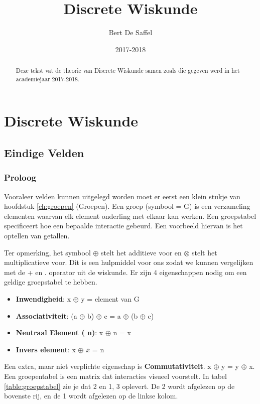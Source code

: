 \documentclass[12pt]{report}
\title{Discrete Wiskunde}
\author{Bert De Saffel}
\date{2017-2018}
\newcommand{\todo}[1] {
\color{red}\textunderscore{\textit{TODO: #1}}
\color{black}
}
\begin{document}
\maketitle
\tableofcontents

\begin{abstract}
 Deze tekst vat de theorie van Discrete Wiskunde samen zoals die gegeven werd in het academiejaar 2017-2018. 
 
\end{abstract}


\part{Discrete Wiskunde}
\chapter{Eindige Velden}

\section{Proloog}
\todo{veel korter schrijven}
Vooraleer velden kunnen uitgelegd worden moet er eerst een klein stukje van hoofdstuk \ref{ch:groepen} (Groepen). 
Een groep (symbool = {\color{red} G}) is een verzameling elementen waarvan elk element onderling met elkaar kan werken. Een groepstabel specificeert hoe een bepaalde 
interactie gebeurd. Een voorbeeld hiervan is het optellen van getallen.


Ter opmerking, het symbool $\oplus$ stelt het additieve voor en $\otimes$ stelt het multiplicatieve voor. Dit is een hulpmiddel
voor ons zodat we kunnen vergelijken met de + en . operator uit de wiskunde.
Er zijn 4 eigenschappen nodig om een geldige groepstabel te hebben.
\begin{itemize}
 \item {\textbf{Inwendigheid}: x $\oplus$ y = element van G}
 \item {\textbf{Associativiteit}: (a $\oplus$ b) $\oplus$ c = a $\oplus$ (b $\oplus$ c)}
 \item {\textbf{Neutraal Element ({\color{red} n})}: x $\oplus$ n = x}
 \item {\textbf{Invers element}: x $\oplus$ $\overline{x}$ = {\color{red} n}}
\end{itemize}
Een extra, maar niet verplichte eigenschap is \textbf{Commutativiteit}. x $\oplus$ y = y $\oplus$ x.
Een groepentabel is een matrix dat interacties visueel voorstelt. In tabel \ref{table:groepstabel} zie je dat 2 en 1, 3 oplevert. 
De 2 wordt afgelezen op de bovenste rij, en de 1 wordt afgelezen op de linkse kolom. 
\end{document}

